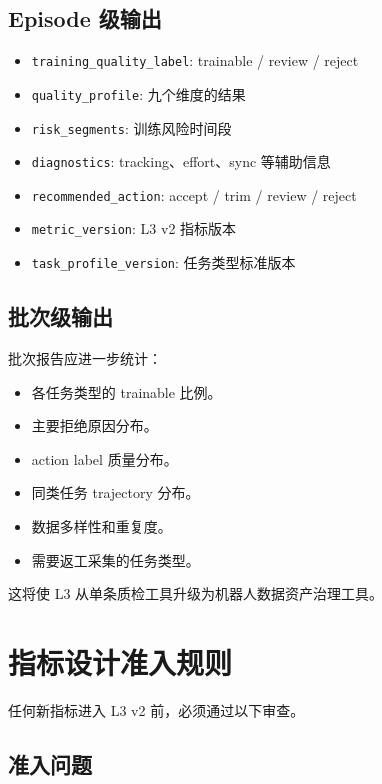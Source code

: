 \documentclass[UTF8,zihao=-4]{ctexart}
\begin{document}
\subsection{Episode 级输出}

\begin{itemize}
  \item \texttt{training\_quality\_label}: trainable / review / reject
  \item \texttt{quality\_profile}: 九个维度的结果
  \item \texttt{risk\_segments}: 训练风险时间段
  \item \texttt{diagnostics}: tracking、effort、sync 等辅助信息
  \item \texttt{recommended\_action}: accept / trim / review / reject
  \item \texttt{metric\_version}: L3 v2 指标版本
  \item \texttt{task\_profile\_version}: 任务类型标准版本
\end{itemize}

\subsection{批次级输出}

批次报告应进一步统计：

\begin{itemize}
  \item 各任务类型的 trainable 比例。
  \item 主要拒绝原因分布。
  \item action label 质量分布。
  \item 同类任务 trajectory 分布。
  \item 数据多样性和重复度。
  \item 需要返工采集的任务类型。
\end{itemize}

这将使 L3 从单条质检工具升级为机器人数据资产治理工具。

\section{指标设计准入规则}

任何新指标进入 L3 v2 前，必须通过以下审查。

\subsection{准入问题}
\end{document}
